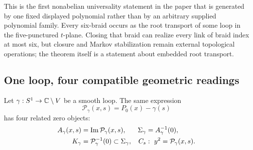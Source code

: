 This is the first nonabelian universality statement in the paper that is
generated by one fixed displayed polynomial rather than by an arbitrary
supplied polynomial family.  Every six-braid occurs as the root transport of
some loop in the five-punctured $t$-plane.  Closing that braid can realize every
link of braid index at most six, but closure and Markov stabilization remain
external topological operations; the theorem itself is a statement about
embedded root transport.

\subsection{One loop, four compatible geometric readings}

Let $\gamma:S^1\to\mathbb{C}\setminus V$ be a smooth loop.  The same expression
\begin{equation}
 \mathcal P_\gamma(x,s)=P_0(x)-\gamma(s)
 \label{eq:sextic-loop-polynomial}
\end{equation}
has four related zero objects:
\begin{align}
 A_\gamma(x,s)&=\operatorname{Im}\mathcal P_\gamma(x,s),
 &\Sigma_\gamma&=A_\gamma^{-1}(0),
 \label{eq:sextic-real-carrier}\\
 K_\gamma&=\mathcal P_\gamma^{-1}(0)\subset\Sigma_\gamma,
 &C_s&:\ y^2=\mathcal P_\gamma(x,s).
 \label{eq:sextic-thread-spectral-curve}
\end{align}


